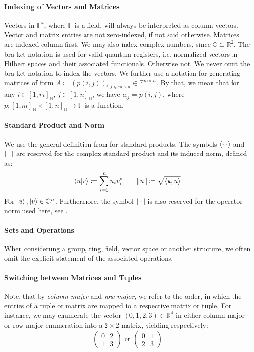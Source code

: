 \paragraph*{Indexing of Vectors and Matrices} Vectors in \(\mathbb{F}^n\), where \(\mathbb{F}\) is a field, will always be interpreted as column vectors. Vector and matrix entries are not zero-indexed, if not said otherwise. Matrices are indexed column-first. We may also index complex numbers, since \(\mathbb{C} \cong \mathbb{R}^2\). The bra-ket notation is used for valid quantum registers, i.e. normalized vectors in Hilbert spaces and their associated functionals. Otherwise not. We never omit the bra-ket notation to index the vectors. We further use a notation for generating matrices of form \(A \coloneqq (p(i, j))_{i, j \in m \times n} \in \mathbb{F}^{m \times n}\). By that, we mean that for any \(i \in [1, m]_{\mathbb{N}}\), \(j \in [1, n]_{\mathbb{N}}\), we have \(a_{ij} = p(i, j)\), where \(p\colon [1, m]_{\mathbb{N}} \times [1, n]_{\mathbb{N}} \to \mathbb{F}\) is a function.

\paragraph*{Standard Product and Norm} We use the general definition from \cite[p. 219]{Werner2018} for standard products. The symbols \(\braket{\cdot}{\cdot}\) and \(\norm{\cdot}\) are reserved for the complex standard product and its induced norm, defined as:
\begin{align}
    \bra{u}\ket{v} \coloneqq \sum_{i=1}^n u_iv_i^* \qquad \norm{u} \coloneqq \sqrt{\langle u, u\rangle}
\end{align}
For \(\ket{u}, \ket{v} \in \mathbb{C}^n\). Furthermore, the symbol \(\norm{\cdot}\) is also reserved for the operator norm used here, see .

\paragraph*{Sets and Operations} When considerung a group, ring, field, vector space or another structure, we often omit the explicit statement of the associated operations.

\paragraph*{Switching between Matrices and Tuples} Note, that by \emph{column-major} and \emph{row-major}, we refer to the order, in which the entries of a tuple or matrix are mapped to a respective matrix or tuple. For instance, we may enumerate the vector \((0, 1, 2, 3) \in \mathbb{R}^4\) in either column-major- or row-major-enumeration into a \(2 \times 2\)-matrix, yielding respectively:
\begin{align}
    \begin{pmatrix}
        0 & 2\\
        1 & 3
    \end{pmatrix} \text{ or }
    \begin{pmatrix}
        0 & 1\\
        2 & 3
    \end{pmatrix}
\end{align}

